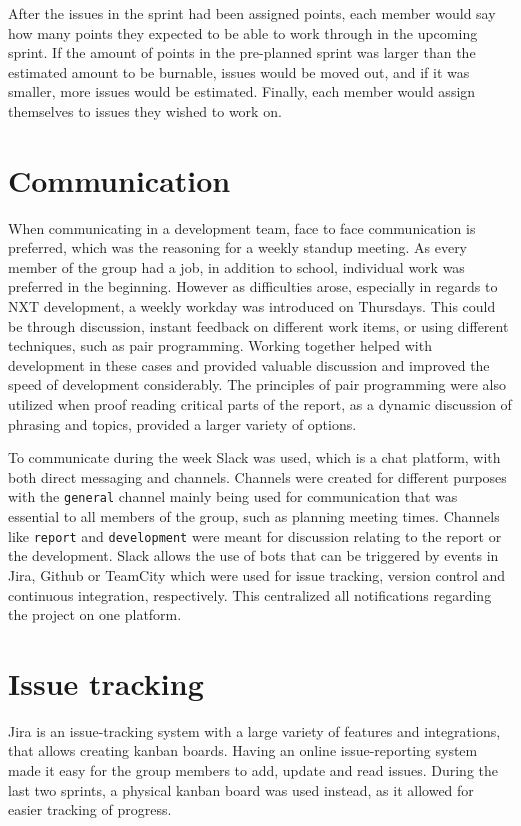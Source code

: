 After the issues in the sprint had been assigned points, each member would say how many points they expected to be able to work through in the upcoming sprint.
If the amount of points in the pre-planned sprint was larger than the estimated amount to be burnable, issues would be moved out, and if it was smaller, more issues would be estimated.
Finally, each member would assign themselves to issues they wished to work on.

\section{Communication}
When communicating in a development team, face to face communication is preferred, which was the reasoning for a weekly standup meeting.
As every member of the group had a job, in addition to school, individual work was preferred in the beginning.
However as difficulties arose, especially in regards to NXT development, a weekly workday was introduced on Thursdays.
This could be through discussion, instant feedback on different work items, or using different techniques, such as pair programming.
Working together helped with development in these cases and provided valuable discussion and improved the speed of development considerably.
The principles of pair programming were also utilized when proof reading critical parts of the report, as a dynamic discussion of phrasing and topics, provided a larger variety of options.

To communicate during the week Slack was used, which is a chat platform, with both direct messaging and channels.
Channels were created for different purposes with the \texttt{general} channel mainly being used for communication that was essential to all members of the group, such as planning meeting times.
Channels like \texttt{report} and \texttt{development} were meant for discussion relating to the report or the development.
Slack allows the use of bots that can be triggered by events in Jira, Github or TeamCity which were used for issue tracking, version control and continuous integration, respectively.
This centralized all notifications regarding the project on one platform.

\section{Issue tracking}
Jira is an issue-tracking system with a large variety of features and integrations, that allows creating kanban boards.
Having an online issue-reporting system made it easy for the group members to add, update and read issues.
During the last two sprints, a physical kanban board was used instead, as it allowed for easier tracking of progress.

